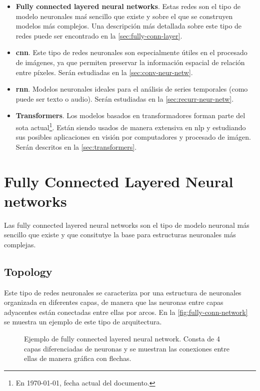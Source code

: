 \begin{itemize}
  \item \textbf{Fully connected layered neural networks}. Estas redes son el
  tipo de modelo neuronales maś sencillo que existe y sobre el que se
  construyen modelos más complejos. Una descripción más detallada sobre este
  tipo de redes puede ser encontrado en la \vref{sec:fully-conn-layer}.
  \item \textbf{\acrlong*{cnn}}. Este tipo de redes neuronales son
  especialmente útiles en el procesado de imágenes, ya que permiten preservar
  la información espacial de relación entre píxeles. Serán estudiadas en la
  \vref{sec:conv-neur-netw}.
  \item \textbf{\acrlong*{rnn}}. Modelos neuronales ideales para el análisis
  de series temporales (como puede ser texto o audio). Serán estudiadas en la
  \vref{sec:recurr-neur-netw}.
  \item \textbf{Transformers}. Los modelos basados en transformadores forman
  parte del \acrlong{sota} actual\footnote{En \today, fecha actual del
    documento.}. Están siendo usados de manera extensiva en \gls{nlp} y
  estudiando sus posibles aplicaciones en visión por computadores y procesado
  de imágen. Serán descritos en la \vref{sec:transformers}.
\end{itemize}


\section{Fully Connected Layered Neural networks}
\label{sec:fully-conn-layer}

Las fully connected layered neural networks son el tipo de modelo neuronal más
sencillo que existe y que consitutye la base para estructuras neuronales más
complejas.

\subsection{Topology}
\label{sec:topology}

Este tipo de redes neuronales se caracteriza por una estructura de neuronales
organizada en diferentes capas, de manera que las neuronas entre capas
adyacentes están conectadas entre ellas por arcos. En la
\vref{fig:fully-conn-network} se muestra un ejemplo de este tipo de
arquitectura.

\begin{figure}[ht]
  \centering
  
  \caption[Fully Connected Neural Network topology]{Ejemplo de fully connected
    layered neural network. Consta de 4 capas diferenciadas de neuronas y se
    muestran las conexiones entre ellas de manera gráfica con flechas.}
  \label{fig:fully-conn-network}
\end{figure}

